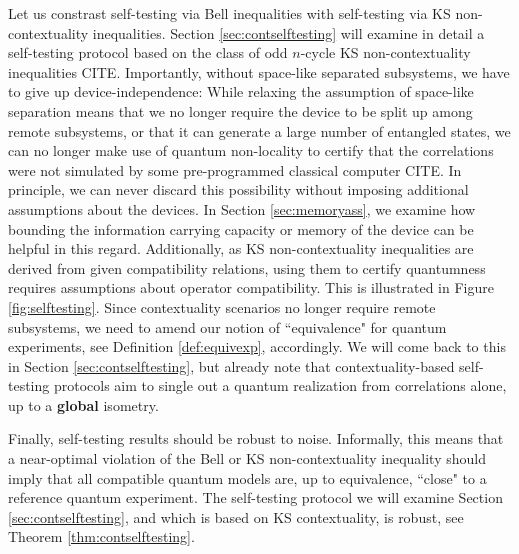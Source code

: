 Let us constrast self-testing via Bell inequalities with self-testing via KS non-contextuality inequalities. Section \ref{sec:contselftesting} will examine in detail a self-testing protocol based on the class of odd $n$-cycle KS non-contextuality inequalities CITE. Importantly, without space-like separated subsystems, we have to give up device-independence: While relaxing the assumption of space-like separation means that we no longer require the device to be split up among remote subsystems, or that it can generate a large number of entangled states, we can no longer make use of quantum non-locality to certify that the correlations were not simulated by some pre-programmed classical computer CITE. In principle, we can never discard this possibility without imposing additional assumptions about the devices. In Section \ref{sec:memoryass}, we examine how bounding the information carrying capacity or memory of the device can be helpful in this regard. Additionally, as KS non-contextuality inequalities are derived from given compatibility relations, using them to certify quantumness requires assumptions about operator compatibility. This is illustrated in Figure \ref{fig:selftesting}. Since contextuality scenarios no longer require remote subsystems, we need to amend our notion of ``equivalence" for quantum experiments, see Definition \ref{def:equivexp}, accordingly. We will come back to this in Section \ref{sec:contselftesting}, but already note that contextuality-based self-testing protocols aim to single out a quantum realization from correlations alone, up to a \textbf{global} isometry.

Finally, self-testing results should be robust to noise. Informally, this means that a near-optimal violation of the Bell or KS non-contextuality inequality should imply that all compatible quantum models are, up to equivalence, ``close" to a reference quantum experiment. The self-testing protocol we will examine Section \ref{sec:contselftesting}, and which is based on KS contextuality, is robust, see Theorem \ref{thm:contselftesting}.

